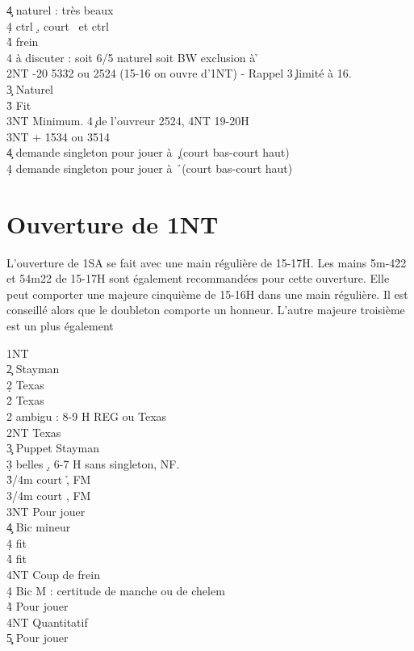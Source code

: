 \documentclass[a4paper]{article}
\begin{document}
\begin{bidtable}
4\c \> naturel : très beaux \c \\
4\d \> ctrl \d , court \s\ et ctrl \c \\
4\h \> frein\\
4\s \> à discuter : soit 6/5 naturel soit BW exclusion à \h \-\\
2NT -20 5332 ou 2524 (15-16 on ouvre d'1NT) - Rappel 3\c\ limité à 16.\+\\
3\c \> Naturel\\
3\h \> Fit \h \\
3NT \> Minimum. 4\c\ de l'ouvreur 2524, 4NT 19-20H\-\\
3NT + 1534 ou 3514\+\\
4\c \> demande singleton pour jouer à \c\ (court bas-court haut)\\
4\d \> demande singleton pour jouer à \h\ (court bas-court haut)\-
\end{bidtable}

\section{Ouverture de 1NT}

L’ouverture de 1SA se fait avec une main régulière de 15-17H. 
Les mains 5m-4\h 22 et 54m22 de 15-17H sont également recommandées pour cette 
ouverture.
Elle peut comporter une majeure cinquième de 15-16H dans une main régulière. Il est 
conseillé alors que le doubleton comporte un honneur. L’autre majeure troisième est un plus 
également

\begin{bidtable}
1NT\+\\
2\c \> Stayman\\
2\d \> Texas \h \\
2\h \> Texas \s \\
2\s \> ambigu : 8-9 H REG ou Texas \c \\
2NT \> Texas \d \\
3\c \> Puppet Stayman\\
3\d {} belles \d , 6-7 H sans singleton, NF.\\
3\h {}/4m court \h , FM\\
3\s {}/4m court \s , FM\\
3NT \> Pour jouer\\
4\c \> Bic mineur\+\\
4\d \> fit \d \\
4\h\s \> fit \c \\
4NT \> Coup de frein\-\\
4\d \> Bic M : certitude de manche ou de chelem\\
4\h\s \> Pour jouer\\
4NT \> Quantitatif\\
5\c\d \> Pour jouer\-
\end{bidtable}
\end{document}
